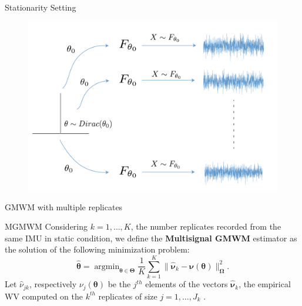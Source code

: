 \documentclass[envcountsect,usenames,dvipsnames]{beamer}
\DeclareMathOperator*{\argmin}{argmin}
\def\btheta{\bm \theta}
\theoremstyle{mystyle}
\begin{document}
\begin{frame}{Stationarity Setting}
    \begin{figure}
        \centering
        \includegraphics[scale = 0.43]{Images/nr_dirac.pdf}
        \label{fig:nrdirac}
    \end{figure}
\end{frame}

\begin{frame}{GMWM with multiple replicates}
    
    \begin{block}{MGMWM}
        Considering $k = 1, \ldots, K$, the number replicates recorded from the same IMU in static condition, we define the {\color{beamer@UIUCblue}\textbf{Multisignal GMWM}} estimator as the solution of the following minimization problem: 
%
        \begin{equation}
	        \hat{\btheta} = \argmin_{\btheta \in \bm{\Theta}} \frac{1}{K} \sum^K_{k=1} \| \hat{\bm{\nu}}_k - {\bm{\nu}}(\btheta)\|^2_{\bm{\Omega}}.
	        \label{eq:mgmwm}
        \end{equation}
    Let $\hat{\nu}_{jk}$, respectively $\nu_j\left(\bm{\theta}\right)$ be the $j^{th}$ elements of the vectors $\hat{\bm{\nu}}_k$, the empirical WV computed on the $k^{th}$ replicates of size $j = 1, \hdots, J_k$ .
    \label{def:mgmwm}
    \end{block}
\end{frame}
\end{document}
